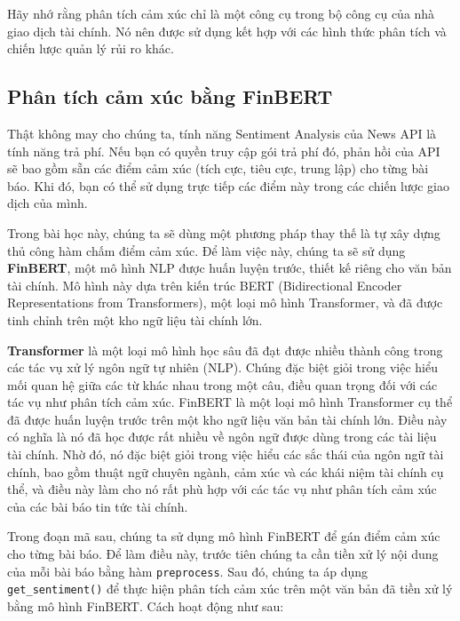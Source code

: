 Hãy nhớ rằng phân tích cảm xúc chỉ là một công cụ trong bộ công cụ của nhà giao dịch tài chính. Nó nên được sử dụng kết hợp với các hình thức phân tích và chiến lược quản lý rủi ro khác.

\subsection{Phân tích cảm xúc bằng FinBERT}

Thật không may cho chúng ta, tính năng Sentiment Analysis của News API là tính năng trả phí. Nếu bạn có quyền truy cập gói trả phí đó, phản hồi của API sẽ bao gồm sẵn các điểm cảm xúc (tích cực, tiêu cực, trung lập) cho từng bài báo. Khi đó, bạn có thể sử dụng trực tiếp các điểm này trong các chiến lược giao dịch của mình.

Trong bài học này, chúng ta sẽ dùng một phương pháp thay thế là tự xây dựng thủ công hàm chấm điểm cảm xúc. Để làm việc này, chúng ta sẽ sử dụng \textbf{FinBERT}, một mô hình NLP được huấn luyện trước, thiết kế riêng cho văn bản tài chính. Mô hình này dựa trên kiến trúc BERT (Bidirectional Encoder Representations from Transformers), một loại mô hình Transformer, và đã được tinh chỉnh trên một kho ngữ liệu tài chính lớn.

\textbf{Transformer} là một loại mô hình học sâu đã đạt được nhiều thành công trong các tác vụ xử lý ngôn ngữ tự nhiên (NLP). Chúng đặc biệt giỏi trong việc hiểu mối quan hệ giữa các từ khác nhau trong một câu, điều quan trọng đối với các tác vụ như phân tích cảm xúc. FinBERT là một loại mô hình Transformer cụ thể đã được huấn luyện trước trên một kho ngữ liệu văn bản tài chính lớn. Điều này có nghĩa là nó đã học được rất nhiều về ngôn ngữ được dùng trong các tài liệu tài chính. Nhờ đó, nó đặc biệt giỏi trong việc hiểu các sắc thái của ngôn ngữ tài chính, bao gồm thuật ngữ chuyên ngành, cảm xúc và các khái niệm tài chính cụ thể, và điều này làm cho nó rất phù hợp với các tác vụ như phân tích cảm xúc của các bài báo tin tức tài chính.

Trong đoạn mã sau, chúng ta sử dụng mô hình FinBERT để gán điểm cảm xúc cho từng bài báo. Để làm điều này, trước tiên chúng ta cần tiền xử lý nội dung của mỗi bài báo bằng hàm \texttt{preprocess}. Sau đó, chúng ta áp dụng \texttt{get\_sentiment()} để thực hiện phân tích cảm xúc trên một văn bản đã tiền xử lý bằng mô hình FinBERT. Cách hoạt động như sau:

